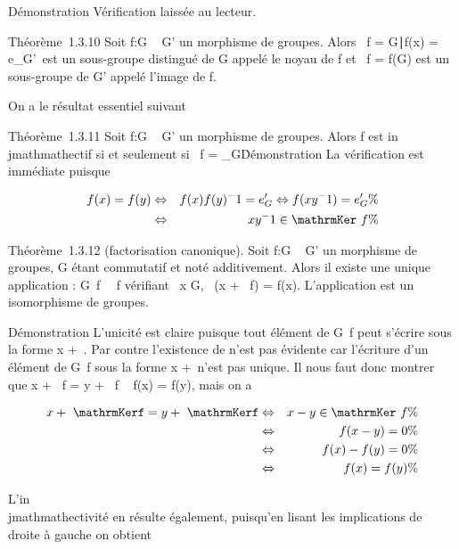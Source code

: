 Démonstration Vérification laissée au lecteur.

Théorème~1.3.10 Soit f:G \rightarrow~ G' un morphisme de groupes. Alors
\mathrmKer~f =
\x \in G∣f(x) =
e_G'\ est un sous-groupe distingué de G appelé
le noyau de f et \mathrmIm~f
= f(G) est un sous-groupe de G' appelé l'image de f.

On a le résultat essentiel suivant

Théorème~1.3.11 Soit f:G \rightarrow~ G' un morphisme de groupes. Alors f est
in\\jmathmathectif si et seulement si
\mathrmKer~f =
\e_G\.

Démonstration La vérification est immédiate puisque

\begin{align*} f(x) = f(y)&
\Leftrightarrow & f(x)f(y)^-1 = e_ G'
\Leftrightarrow f(xy^-1) = e_ G'\%&
\\ & \Leftrightarrow &
xy^-1
\in\mathrmKer~f \%&
\\ \end{align*}

Théorème~1.3.12 (factorisation canonique). Soit f:G \rightarrow~ G' un morphisme de
groupes, G étant commutatif et noté additivement. Alors il existe une
unique application \overlinef :
G\diagup\mathrmKer~f
\rightarrow~\mathrmIm~f vérifiant
\forall~x \in G, \overlinef~(x
+ \mathrmKer~f) = f(x).
L'application \overlinef est un isomorphisme de
groupes.

Démonstration L'unicité est claire puisque tout élément de
G\diagup\mathrmKer~f peut s'écrire
sous la forme x +\
\mathrmKerf. Par contre l'existence de
\overlinef n'est pas évidente car l'écriture d'un
élément de G\diagup\mathrmKer~f
sous la forme x +\
\mathrmKerf n'est pas unique. Il nous faut donc
montrer que x + \mathrmKer~f
= y + \mathrmKer~f \rigtharrow~ f(x) =
f(y), mais on a

\begin{align*} x +\
\mathrmKerf = y +\
\mathrmKerf& \Leftrightarrow & x - y
\in\mathrmKer~f \%&
\\ & \Leftrightarrow & f(x
- y) = 0 \%& \\ &
\Leftrightarrow & f(x) - f(y) = 0\%&
\\ & \Leftrightarrow & f(x)
= f(y) \%& \\
\end{align*}

L'in\\jmathmathectivité en résulte également, puisqu'en lisant les implications de
droite à gauche on obtient

